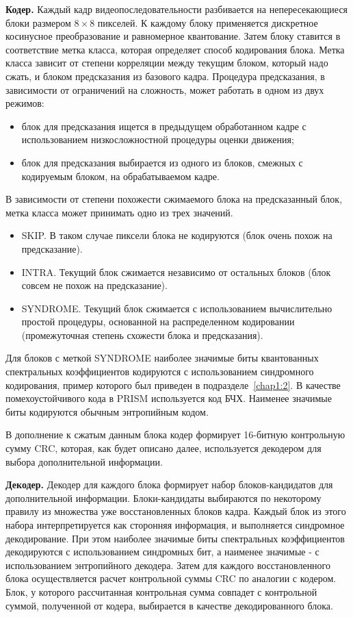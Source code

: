\textbf{Кодер.} Каждый кадр видеопоследовательности разбивается на непересекающиеся блоки размером $8\times 8$ пикселей. К каждому блоку применяется дискретное косинусное преобразование и равномерное квантование. Затем блоку ставится в соответствие метка класса, которая определяет способ кодирования блока. Метка класса зависит от степени корреляции между текущим блоком, который надо сжать, и блоком предсказания из базового кадра. Процедура предсказания, в зависимости от ограничений на сложность, может работать в одном из двух режимов:

\begin{itemize}
\item блок для предсказания ищется в предыдущем обработанном кадре с использованием низкосложностной процедуры оценки движения;
\item блок для предсказания выбирается из одного из блоков, смежных с кодируемым блоком, на обрабатываемом кадре.
\end{itemize}

В зависимости от степени похожести сжимаемого блока на предсказанный блок, метка класса может принимать одно из трех значений.

\begin{itemize}
\item SKIP. В таком случае пиксели блока не кодируются (блок очень похож на предсказание).
\item INTRA. Текущий блок сжимается независимо от остальных блоков (блок совсем не похож на предсказание).
\item SYNDROME. Текущий блок сжимается с использованием вычислительно простой процедуры, основанной на распределенном кодировании (промежуточная степень схожести блока и предсказания).
\end{itemize}

Для блоков с меткой SYNDROME наиболее значимые биты квантованных спектральных коэффициентов кодируются с использованием синдромного кодирования, пример которого был приведен в подразделе~\ref{chap1:2}. В качестве помехоустойчивого кода в PRISM используется код БЧХ. Наименее значимые биты кодируются обычным энтропийным кодом.

В дополнение к сжатым данным блока кодер формирует 16-битную контрольную сумму CRC, которая, как будет описано далее, используется декодером для выбора дополнительной информации.

\textbf{Декодер.} Декодер для каждого блока формирует набор блоков-кандидатов для дополнительной информации. Блоки-кандидаты выбираются по некоторому правилу из множества уже восстановленных блоков кадра. Каждый блок из этого набора интерпретируется как сторонняя информация, и выполняется синдромное декодирование. При этом наиболее значимые биты спектральных коэффициентов декодируются с использованием синдромных бит, а наименее значимые - с использованием энтропийного декодера. Затем для каждого восстановленного блока осуществляется расчет контрольной суммы CRC по аналогии с кодером. Блок, у которого рассчитанная контрольная сумма совпадет с контрольной суммой, полученной от кодера, выбирается в качестве декодированного блока.

